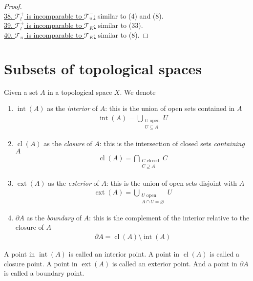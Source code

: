 \documentclass{treatise}
\begin{document}
\begin{proof}
\\
\underline{38. $\mathcal{T}_l^+$ is incomparable to $\mathcal{T}_u^-$:} similar to (4) and (8).
\\
\underline{39. $\mathcal{T}_l^+$ is incomparable to $\mathcal{T}_K$:} similar to (33).
\\
\underline{40. $\mathcal{T}_u^-$ is incomparable to $\mathcal{T}_K$:} similar to (8).
\end{proof}

\newpage

\section{Subsets of topological spaces}
Given a set $A$ in a topological space $X$. We denote
\begin{enumerate}
    \item $\operatorname{int}(A)$ as the \emph{interior} of $A$: this is the union of open sets contained in $A$
    \begin{align*}
        \operatorname{int}(A) = \bigcup_{\substack{U \text{ open} \\ U \subseteq A}} U
    \end{align*}
    \item $\operatorname{cl}(A)$ as the \emph{closure} of $A$: this is the intersection of closed sets \textit{containing} $A$
    \begin{align*}
        \operatorname{cl}(A) = \bigcap_{\substack{C \text{ closed} \\ C \supseteq A}} C
    \end{align*}
    \item $\operatorname{ext}(A)$ as the \emph{exterior} of $A$: this is the union of open sets disjoint with $A$
    \begin{align*}
        \operatorname{ext}(A) = \bigcup_{\substack{U \text{ open} \\ A \cap U = \varnothing}} U
    \end{align*}
    \item $\partial A$ as the \emph{boundary} of $A$: this is the complement of the interior relative to the closure of $A$
    \begin{align*}
        \partial A = \operatorname{cl}(A) \setminus \operatorname{int}(A)
    \end{align*}
\end{enumerate}
A point in $\operatorname{int}(A)$ is called an interior point. A point in $\operatorname{cl}(A)$ is called a closure point. A point in $\operatorname{ext}(A)$ is called an exterior point. And a point in $\partial A$ is called a boundary point.
\end{document}

